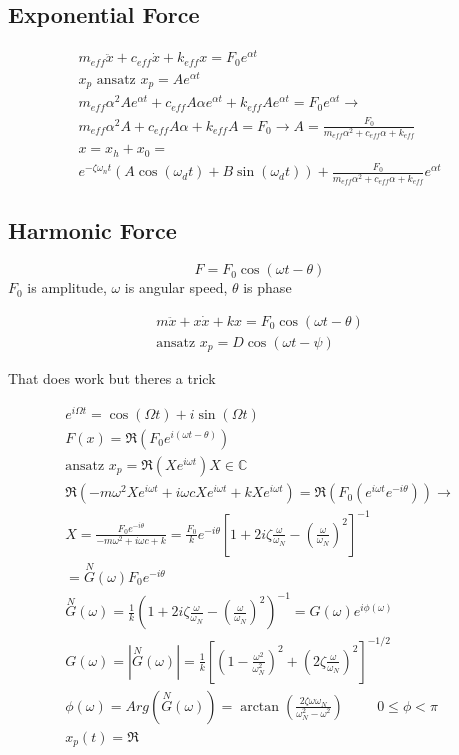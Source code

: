 \documentclass[fleqn]{report}
\newcommand{\hp}{\hspace{1cm}}
\newcommand{\equations} [1] {
\begin{gather*}
#1
\end{gather*}
}
\begin{document}
\subsection{Exponential Force}
\equations{
    m_{eff} \ddot x + c_{eff} \dot x + k_{eff} x = F_0 e^{\alpha t}
    \\
    \textrm{$x_p$ ansatz $x_p = A e^{\alpha t}$}
    \\
    m_{eff} \alpha^2 A e^{\alpha t} + c_{eff} A \alpha e^{\alpha t} + k_{eff} A e^{\alpha t} = F_0 e^{\alpha t}
    \rightarrow 
    \\
    m_{eff} \alpha^2 A + c_{eff} A \alpha + k_{eff} A  
    = F_0 
    \rightarrow
    A = 
    \frac{F_0}{m_{eff} \alpha^2 + c_{eff} \alpha + k_{eff}}
    \\
    x = x_h + x_0 = 
    \\
    e^{-\zeta \omega_n t} (A \cos(\omega_d t) + B \sin(\omega_d t)) + 
    \frac{F_0}{m_{eff} \alpha^2 + c_{eff} \alpha + k_{eff}} e^{\alpha t}
}

\subsection{Harmonic Force}
\[
    F = F_0 \cos(\omega t - \theta)
\]
$F_0$ is amplitude, $\omega$ is angular speed, $\theta$ is phase 

\equations{
    m \ddot x + x \dot x + kx = F_0 \cos(\omega t - \theta)
    \\
    \textrm{ansatz $x_p = D \cos(\omega t - \psi)$}
}

That does work but theres a trick 
\equations{
    e^{i \Omega t} = \cos(\Omega t) + i \sin(\Omega t)
    \\
    F(x) = \Re (F_0 e^{i(\omega t - \theta)})
    \\
    \textrm{ansatz $x_p = \Re (X e^{i \omega t}) X \in \mathbb{C}$}
    \\
    \Re (-m \omega^2 X e^{i \omega t} + i \omega c X e^{i \omega t} + k X e^{i \omega t}) = \Re (F_0 (e^{i \omega t} e^{-i \theta }))
    \rightarrow 
    \\
    X = \frac{F_0 e^{-i \theta}}{-m \omega^2 + i \omega c + k}
    =
    \frac{F_0}{k} e^{-i \theta} \left[
        1 + 2 i \zeta \frac{\omega}{\omega_N} - 
        \left( \frac{\omega}{\omega_N}\right)^2
    \right]^{-1}
    \\
    =
    \overset{N}{G}(\omega) F_0 e^{-i \theta}
    \\
    \overset{N}{G}(\omega) = \frac{1}{k} \left(
        1 + 2 i \zeta \frac{\omega}{\omega_N} - \left( \frac{\omega}{\omega_N}\right)^2
    \right)^{-1}
    =
    G(\omega) e^{i \phi(\omega)}
    \\
    G(\omega) = |\overset{N}{G}(\omega)| = \frac{1}{k} 
    \left[
        \left(
            1 - \frac{\omega^2}{\omega_N^2}
        \right)^2
        +
        \left(
            2 \zeta \frac{\omega}{\omega_N}
        \right)^2
    \right]^{-1/2}
    \\
    \phi(\omega) = Arg(\overset{N}{G}(\omega))
    =
    \arctan(\frac{2 \zeta \omega \omega_N}{\omega_N^2 - \omega^2})
    \hp 
    0 \leq \phi < \pi 
    \\
    x_p(t) = \Re
}
\end{document}
